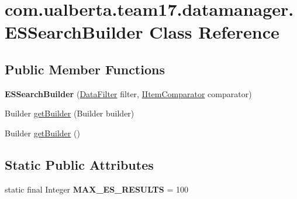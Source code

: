 \hypertarget{classcom_1_1ualberta_1_1team17_1_1datamanager_1_1_e_s_search_builder}{\section{com.\+ualberta.\+team17.\+datamanager.\+E\+S\+Search\+Builder Class Reference}
\label{classcom_1_1ualberta_1_1team17_1_1datamanager_1_1_e_s_search_builder}
}
\subsection*{Public Member Functions}
\begin{DoxyCompactItemize}
\item 
\hypertarget{classcom_1_1ualberta_1_1team17_1_1datamanager_1_1_e_s_search_builder_a3e05367a8efae3e4e3c96acb771d2520}{{\bfseries E\+S\+Search\+Builder} (\hyperlink{classcom_1_1ualberta_1_1team17_1_1datamanager_1_1_data_filter}{Data\+Filter} filter, \hyperlink{interfacecom_1_1ualberta_1_1team17_1_1datamanager_1_1_i_item_comparator}{I\+Item\+Comparator} comparator)}\label{classcom_1_1ualberta_1_1team17_1_1datamanager_1_1_e_s_search_builder_a3e05367a8efae3e4e3c96acb771d2520}

\item 
Builder \hyperlink{classcom_1_1ualberta_1_1team17_1_1datamanager_1_1_e_s_search_builder_ac79a6a92f02223456632e69f16ff9943}{get\+Builder} (Builder builder)
\item 
Builder \hyperlink{classcom_1_1ualberta_1_1team17_1_1datamanager_1_1_e_s_search_builder_a97ec92bd4100e97570f6ab70462c71c6}{get\+Builder} ()
\end{DoxyCompactItemize}
\subsection*{Static Public Attributes}
\begin{DoxyCompactItemize}
\item 
\hypertarget{classcom_1_1ualberta_1_1team17_1_1datamanager_1_1_e_s_search_builder_a730bf40e871d94cc8b18c19eb5d74e05}{static final Integer {\bfseries M\+A\+X\+\_\+\+E\+S\+\_\+\+R\+E\+S\+U\+L\+T\+S} = 100}\label{classcom_1_1ualberta_1_1team17_1_1datamanager_1_1_e_s_search_builder_a730bf40e871d94cc8b18c19eb5d74e05}

\end{DoxyCompactItemize}



